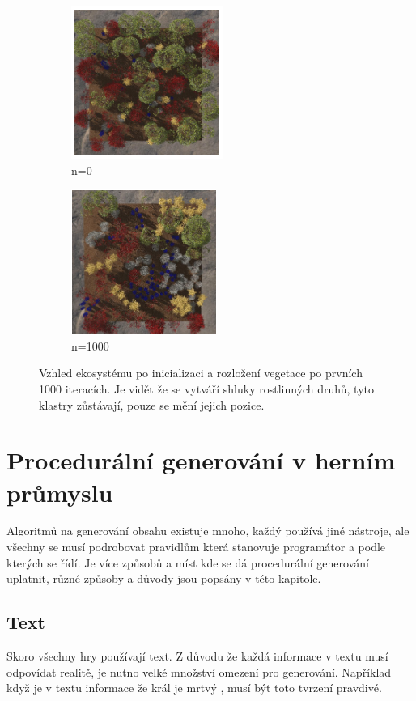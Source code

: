 \begin{figure}[h]
	\centering
	\begin{subfigure}{0.475\textwidth}
		\centering
		\includegraphics[scale=1]{obrazky-figures/treesStart.png}
		\caption{n=0}
	\end{subfigure}
	\begin{subfigure}{0.475\textwidth}
		\centering
		\includegraphics[scale=1]{obrazky-figures/treesEnd.png}
		\caption{n=1000}
	\end{subfigure}
	\caption[generatedTrees]{Vzhled ekosystému po inicializaci a rozložení vegetace po prvních 1000 iteracích. Je vidět že se vytváří shluky rostlinných druhů, tyto klastry zůstávají, pouze se mění jejich pozice.}
\end{figure}

\section{Procedurální generování v herním průmyslu}
\label{proceduralInGames}
Algoritmů na generování obsahu existuje mnoho, každý používá jiné nástroje, ale všechny se musí podrobovat pravidlům která stanovuje programátor a podle kterých se řídí. Je více způsobů a míst kde se dá procedurální generování uplatnit, různé způsoby a důvody jsou popsány v této kapitole.

\subsection{Text}
Skoro všechny hry používají text. Z důvodu že každá informace v textu musí odpovídat realitě, je nutno velké množství omezení pro generování. Například když je v textu informace že král je mrtvý \cite{liuDeep}, musí být toto tvrzení pravdivé.

